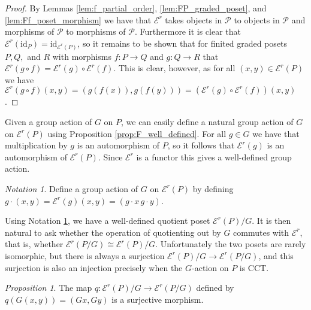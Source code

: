 \documentclass[10 pt]{amsart}
\theoremstyle{plain}
\theoremstyle{definition}
\theoremstyle{remark}
\numberwithin{equation}{section}
\newtheorem{prop}[thm]{Proposition}
\theoremstyle{remark}
\newtheorem{note}[thm]{Notation}
\newcommand\rk{\operatorname{rk}}
\newcommand{\id}{\mathrm{id}}
\begin{document}
\begin{proof}
By Lemmas \ref{lem:f_partial_order}, \ref{lem:FP_graded_poset}, and \ref{lem:Ff_poset_morphism} we have that $\mathcal E^r$ takes objects in $\mathcal{P}$ to objects in $\mathcal{P}$ and morphisms of $\mathcal{P}$ to morphisms of $\mathcal{P}$.  Furthermore it is clear that $\mathcal E^r(\id_P) = \id_{\mathcal E^r(P)}$, so it remains to be shown that for finited graded posets $P, Q,$ and $R$ with morphisms $f\colon P\rightarrow Q$ and $g\colon Q\rightarrow R$ that $\mathcal E^r(g\circ f) = \mathcal E^r(g)\circ\mathcal E^r(f)$.  This is clear, however, as for all $(x, y)\in \mathcal E^r(P)$ we have $\mathcal E^r(g\circ f)(x, y) = (g(f(x)), g(f(y))) = \left(\mathcal E^r(g)\circ\mathcal E^r(f)\right)(x, y)$.
\end{proof}



Given a group action of $G$ on $P$, we can easily define a natural group action of $G$ on $\mathcal E^r(P)$ using Proposition \ref{prop:F_well_defined}.  For all $g\in G$ we have that multiplication by $g$ is an automorphism of $P$, so it follows that $\mathcal E^r(g)$ is an automorphism of $\mathcal E^r(P)$.  Since $\mathcal E^r$ is a functor this gives a well-defined group action.

\begin{note}\label{note:G_action_on_FP}
Define a group action of $G$ on $\mathcal E^r(P)$ by defining $g\cdot (x, y) = \mathcal E^r(g)(x,y) = (g\cdot x\, g\cdot y)$.
\end{note}

Using Notation \ref{note:G_action_on_FP}, we have a well-defined quotient poset $\mathcal E^r(P)/G$.  It is then natural to ask whether the operation of quotienting out by $G$ commutes with $\mathcal E^r$, that is, whether $\mathcal E^r(P/G) \cong \mathcal E^r(P)/G$.  Unfortunately the two posets are rarely isomorphic, but there is always a surjection $\mathcal E^r(P)/G\rightarrow \mathcal E^r(P/G)$, and this surjection is also an injection precisely when the $G$-action on $P$ is CCT.


\begin{prop}\label{prop:surjection_between_F_quotients}
The map $q\colon \mathcal E^r(P)/G\rightarrow \mathcal E^r(P/G)$ defined by $q(G(x, y)) = (Gx,Gy)$ is a surjective morphism.
\end{prop}
\end{document}
